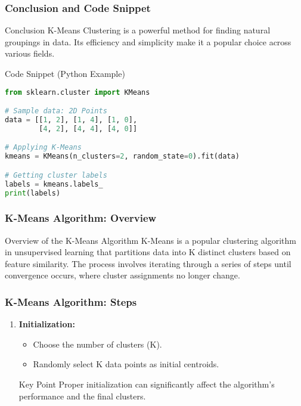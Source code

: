 \documentclass[aspectratio=169]{beamer}
\begin{document}
\begin{frame}[fragile]
    \frametitle{Conclusion and Code Snippet}
    \begin{block}{Conclusion}
        K-Means Clustering is a powerful method for finding natural groupings in data. Its efficiency and simplicity make it a popular choice across various fields.
    \end{block}
    
    \begin{block}{Code Snippet (Python Example)}
        \begin{lstlisting}[language=Python]
from sklearn.cluster import KMeans

# Sample data: 2D Points
data = [[1, 2], [1, 4], [1, 0],
        [4, 2], [4, 4], [4, 0]]

# Applying K-Means
kmeans = KMeans(n_clusters=2, random_state=0).fit(data)

# Getting cluster labels
labels = kmeans.labels_
print(labels)
        \end{lstlisting}
    \end{block}
\end{frame}

\begin{frame}[fragile]
    \frametitle{K-Means Algorithm: Overview}
    \begin{block}{Overview of the K-Means Algorithm}
        K-Means is a popular clustering algorithm in unsupervised learning that partitions data into K distinct clusters based on feature similarity. The process involves iterating through a series of steps until convergence occurs, where cluster assignments no longer change.
    \end{block}
\end{frame}

\begin{frame}[fragile]
    \frametitle{K-Means Algorithm: Steps}
    \begin{enumerate}
        \item \textbf{Initialization:}
        \begin{itemize}
            \item Choose the number of clusters (K).
            \item Randomly select K data points as initial centroids.
        \end{itemize}
        
        \begin{block}{Key Point}
            Proper initialization can significantly affect the algorithm's performance and the final clusters.
        \end{block}
    \end{enumerate}
\end{frame}
\end{document}
